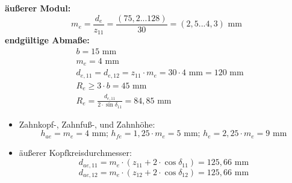 \textbf{äußerer Modul:}
\[
m_e = \frac{d_e}{z_{11}} = \frac{(75,2...128)}{30} = (2,5...4,3) \text{ mm}
\]
\textbf{endgültige Abmaße:}
\begin{align*}
	&b= 15 \text{ mm} \\
	&m_e=4 \text{ mm} \\ 
	&d_{e,11} =d_{e,12} = z_{11} \cdot m_e = 30 \cdot 4 \text{ mm} = 120 \text{ mm} \\
	&R_e \ge 3 \cdot b = 45 \text{ mm} \\
	&R_e = \frac{d_{e,11}}{2 \cdot \sin \delta_{11}} = 84,85 \text{ mm}
\end{align*}
\begin{itemize}
	\item Zahnkopf-, Zahnfuß-, und Zahnhöhe:
	\[
	h_{ae} = m_e = 4 \text{ mm; } h_{fe} = 1,25 \cdot m_e =5 \text{ mm; } h_e = 2,25 \cdot m_e = 9 \text{ mm}
	\]
	\item äußerer Kopfkreisdurchmesser:
	\[
	d_{ae,11} = m_e \cdot (z_{11} + 2 \cdot \cos \delta_{11}) = 125,66 \text{ mm}
	\]
	\[
	d_{ae,12} = m_e \cdot (z_{12} + 2 \cdot \cos \delta_{12}) = 125,66 \text{ mm}
	\]
\end{itemize}
